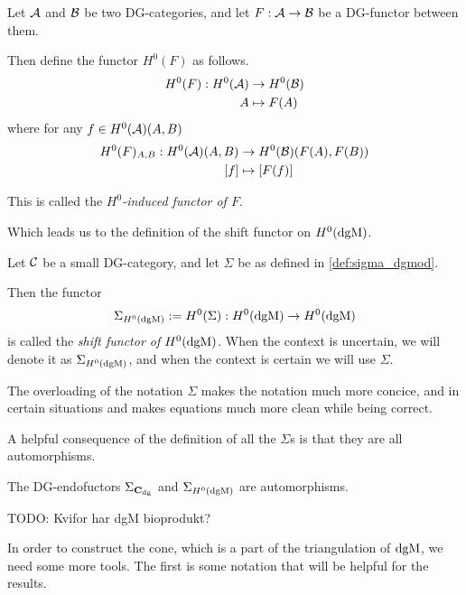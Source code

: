 \begin{definition}
    \label{def:H^0-induced_functor}
    Let \( {\mathcal{A}} \) and \( {\mathcal{B}} \) be two DG-categories, and let \( F: {\mathcal{A}} \to {\mathcal{B}} \) be a DG-functor between them.

    Then define the functor \( H^0(F) \) as follows.
    \begin{align*}
        H^0(F): H^0({\mathcal{A}}) &\to H^0({\mathcal{B}}) \\
        A &\mapsto F(A)
    \end{align*}
    where for any \( f \in H^0({\mathcal{A}})(A, B) \)
    \begin{align*}
        H^0(F)_{A, B}: H^0({\mathcal{A}})(A, B) &\to H^0({\mathcal{B}})(F(A), F(B)) \\
        [f] &\mapsto [F(f)]
    \end{align*}

    This is called the \emph{\( H^0 \)-induced functor of \( F \)}.
\end{definition}

Which leads us to the definition of the shift functor on \( H^0(\operatorname{dgM}) \).

\begin{definition}
    \label{def:sigma_h_0_dgmod}
    Let \( {\mathcal{C}} \) be a small DG-category, and let \( \Sigma \) be as defined in \autoref{def:sigma_dgmod}.

    Then the functor
    \[
        \Sigma_{H^0(\operatorname{dgM})} := H^0(\Sigma): H^0(\operatorname{dgM}) \to H^0(\operatorname{dgM})
    \]
    is called the \emph{shift functor of \( H^0(\operatorname{dgM}) \)}. When the context is uncertain, we will denote it as \( \Sigma_{H^0(\operatorname{dgM})} \), and when the context is certain we will use \( \Sigma \).
\end{definition}

The overloading of the notation \( \Sigma \) makes the notation much more concice, and in certain situations and makes equations much more clean while being correct.

A helpful consequence of the definition of all the \( \Sigma \)s is that they are all automorphisms.
\begin{remark}
    \label{rem:dgm_sigma_automorphism}
    The DG-endofuctors \( \Sigma_{\operatorname{\mathbf{C}}_{\operatorname{dg}}} \) and \( \Sigma_{H^0(\operatorname{dgM})} \) are automorphisms.
\end{remark}

TODO: Kvifor har dgM bioprodukt?

In order to construct the cone, which is a part of the triangulation of \( \operatorname{dgM} \), we need some more tools. The first is some notation that will be helpful for the results.

